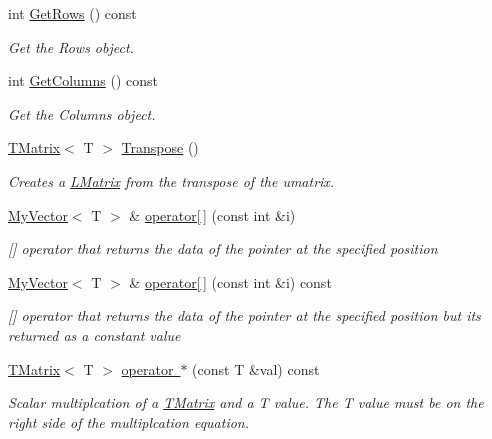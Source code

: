 \begin{DoxyCompactItemize}
int \mbox{\hyperlink{class_t_matrix_a93053319a54bdb1dce4271757b996b64}{Get\+Rows}} () const
\begin{DoxyCompactList}\small\item\em Get the Rows object. \end{DoxyCompactList}\item 
int \mbox{\hyperlink{class_t_matrix_ab4ca595133f10eadcebe6d78aa260d0c}{Get\+Columns}} () const
\begin{DoxyCompactList}\small\item\em Get the Columns object. \end{DoxyCompactList}\item 
\mbox{\hyperlink{class_t_matrix}{T\+Matrix}}$<$ T $>$ \mbox{\hyperlink{class_t_matrix_a00c68321d71e62d641c711be9dd01b8a}{Transpose}} ()
\begin{DoxyCompactList}\small\item\em Creates a \mbox{\hyperlink{class_l_matrix}{L\+Matrix}} from the transpose of the umatrix. \end{DoxyCompactList}\item 
\mbox{\hyperlink{class_my_vector}{My\+Vector}}$<$ T $>$ \& \mbox{\hyperlink{class_t_matrix_adf8f6ca427e37e867e89c215f4f9ef0b}{operator\mbox{[}$\,$\mbox{]}}} (const int \&i)
\begin{DoxyCompactList}\small\item\em \mbox{[}\mbox{]} operator that returns the data of the pointer at the specified position \end{DoxyCompactList}\item 
\mbox{\hyperlink{class_my_vector}{My\+Vector}}$<$ T $>$ \& \mbox{\hyperlink{class_t_matrix_a93ab7e799762304bf16da08c30edd413}{operator\mbox{[}$\,$\mbox{]}}} (const int \&i) const
\begin{DoxyCompactList}\small\item\em \mbox{[}\mbox{]} operator that returns the data of the pointer at the specified position but its returned as a constant value \end{DoxyCompactList}\item 
\mbox{\hyperlink{class_t_matrix}{T\+Matrix}}$<$ T $>$ \mbox{\hyperlink{class_t_matrix_a4d6a92d764a31d148199dc55298771db}{operator $\ast$}} (const T \&val) const
\begin{DoxyCompactList}\small\item\em Scalar multiplcation of a \mbox{\hyperlink{class_t_matrix}{T\+Matrix}} and a T value. The T value must be on the right side of the multiplcation equation. \end{DoxyCompactList}\item 

\end{DoxyCompactItemize}
